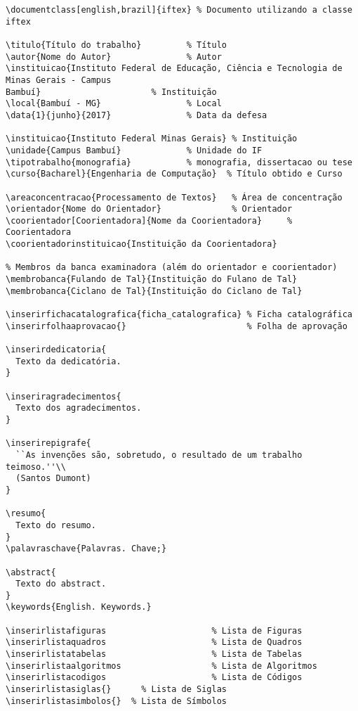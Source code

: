 \begin{Verbatim}[frame=single, fontsize=\scriptsize]
\documentclass[english,brazil]{iftex} % Documento utilizando a classe iftex

\titulo{Título do trabalho}         % Título
\autor{Nome do Autor}               % Autor
\instituicao{Instituto Federal de Educação, Ciência e Tecnologia de Minas Gerais - Campus
Bambuí}                      % Instituição
\local{Bambuí - MG}                 % Local
\data{1}{junho}{2017}               % Data da defesa

\instituicao{Instituto Federal Minas Gerais} % Instituição
\unidade{Campus Bambuí}             % Unidade do IF
\tipotrabalho{monografia}           % monografia, dissertacao ou tese
\curso{Bacharel}{Engenharia de Computação}  % Título obtido e Curso

\areaconcentracao{Processamento de Textos}   % Área de concentração
\orientador{Nome do Orientador}              % Orientador
\coorientador[Coorientadora]{Nome da Coorientadora}     % Coorientadora
\coorientadorinstituicao{Instituição da Coorientadora}

% Membros da banca examinadora (além do orientador e coorientador)
\membrobanca{Fulando de Tal}{Instituição do Fulano de Tal}
\membrobanca{Ciclano de Tal}{Instituição do Ciclano de Tal}

\inserirfichacatalografica{ficha_catalografica} % Ficha catalográfica
\inserirfolhaaprovacao{}                        % Folha de aprovação

\inserirdedicatoria{
  Texto da dedicatória.
}

\inseriragradecimentos{
  Texto dos agradecimentos.
}

\inserirepigrafe{
  ``As invenções são, sobretudo, o resultado de um trabalho teimoso.''\\
  (Santos Dumont)
}

\resumo{
  Texto do resumo.
}
\palavraschave{Palavras. Chave;}

\abstract{
  Texto do abstract.
}
\keywords{English. Keywords.}

\inserirlistafiguras                     % Lista de Figuras
\inserirlistaquadros                     % Lista de Quadros
\inserirlistatabelas                     % Lista de Tabelas
\inserirlistaalgoritmos                  % Lista de Algoritmos
\inserirlistacodigos                     % Lista de Códigos
\inserirlistasiglas{}      % Lista de Siglas
\inserirlistasimbolos{}  % Lista de Símbolos


\end{Verbatim}
